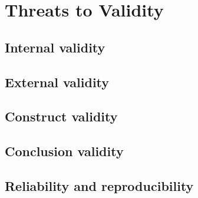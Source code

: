 \section{Threats to Validity}
\label{sec:threats}


\subsection{Internal validity}
\label{sec:threats:internal}

\subsection{External validity}
\label{sec:threats:external}

\subsection{Construct validity}
\label{sec:threats:construct}

\subsection{Conclusion validity}
\label{sec:threats:conclusion}

\subsection{Reliability and reproducibility}
\label{sec:threats:reliability}

